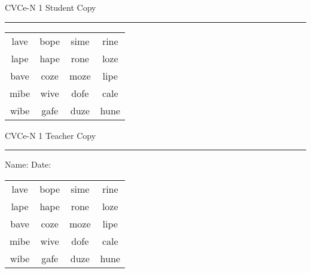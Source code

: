 \documentclass{memoir}
\begin{document}

\footnotesize \noindent
CVCe-N 1 \hfill Student Copy
\smallskip
\hrule

\Large

\setlength{\tabcolsep}{14pt}
\def\arraystretch{2}

{\selectfont


\begin{vplace}[0.5]
\begin{center}
\begin{tabular}{cccc}
lave & bope & sime & rine \\
lape & hape & rone & loze \\
bave & coze & moze & lipe \\
mibe & wive & dofe & cale \\
wibe & gafe & duze & hune \\
\end{tabular}
\end{center}
\end{vplace}

}

\newpage

\footnotesize \noindent
CVCe-N 1 \hfill Teacher Copy
\smallskip
\hrule

\small

\vfill

\noindent
Name: \underline{\hspace{1.75in}} \hfill Date: \underline{\hspace{1in}}

\Large

{\selectfont


\begin{vplace}[0.5]
\begin{center}
\begin{tabular}{cccc}
lave & bope & sime & rine \\
lape & hape & rone & loze \\
bave & coze & moze & lipe \\
mibe & wive & dofe & cale \\
wibe & gafe & duze & hune \\
\end{tabular}
\end{center}
\end{vplace}



}
\end{document}
